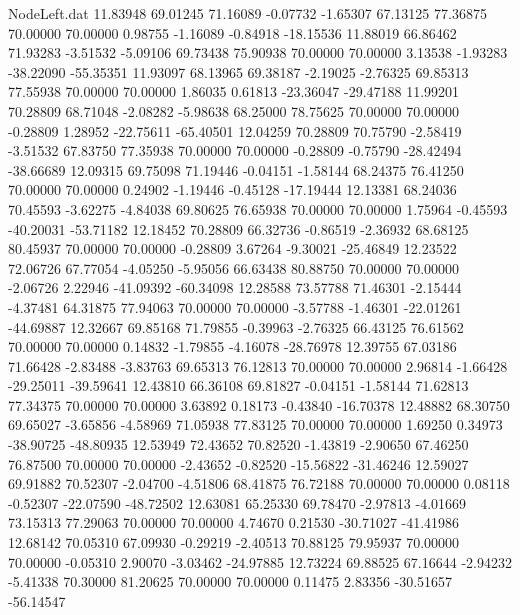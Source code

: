 \begin{filecontents}{NodeLeft.dat}
  11.83948   69.01245   71.16089    -0.07732   -1.65307   67.13125   77.36875   70.00000   70.00000    0.98755   -1.16089   -0.84918  -18.15536
  11.88019   66.86462   71.93283    -3.51532   -5.09106   69.73438   75.90938   70.00000   70.00000    3.13538   -1.93283  -38.22090  -55.35351
  11.93097   68.13965   69.38187    -2.19025   -2.76325   69.85313   77.55938   70.00000   70.00000    1.86035    0.61813  -23.36047  -29.47188
  11.99201   70.28809   68.71048    -2.08282   -5.98638   68.25000   78.75625   70.00000   70.00000   -0.28809    1.28952  -22.75611  -65.40501
  12.04259   70.28809   70.75790    -2.58419   -3.51532   67.83750   77.35938   70.00000   70.00000   -0.28809   -0.75790  -28.42494  -38.66689
  12.09315   69.75098   71.19446    -0.04151   -1.58144   68.24375   76.41250   70.00000   70.00000    0.24902   -1.19446   -0.45128  -17.19444
  12.13381   68.24036   70.45593    -3.62275   -4.84038   69.80625   76.65938   70.00000   70.00000    1.75964   -0.45593  -40.20031  -53.71182
  12.18452   70.28809   66.32736    -0.86519   -2.36932   68.68125   80.45937   70.00000   70.00000   -0.28809    3.67264   -9.30021  -25.46849
  12.23522   72.06726   67.77054    -4.05250   -5.95056   66.63438   80.88750   70.00000   70.00000   -2.06726    2.22946  -41.09392  -60.34098
  12.28588   73.57788   71.46301    -2.15444   -4.37481   64.31875   77.94063   70.00000   70.00000   -3.57788   -1.46301  -22.01261  -44.69887
  12.32667   69.85168   71.79855    -0.39963   -2.76325   66.43125   76.61562   70.00000   70.00000    0.14832   -1.79855   -4.16078  -28.76978
  12.39755   67.03186   71.66428    -2.83488   -3.83763   69.65313   76.12813   70.00000   70.00000    2.96814   -1.66428  -29.25011  -39.59641
  12.43810   66.36108   69.81827    -0.04151   -1.58144   71.62813   77.34375   70.00000   70.00000    3.63892    0.18173   -0.43840  -16.70378
  12.48882   68.30750   69.65027    -3.65856   -4.58969   71.05938   77.83125   70.00000   70.00000    1.69250    0.34973  -38.90725  -48.80935
  12.53949   72.43652   70.82520    -1.43819   -2.90650   67.46250   76.87500   70.00000   70.00000   -2.43652   -0.82520  -15.56822  -31.46246
  12.59027   69.91882   70.52307    -2.04700   -4.51806   68.41875   76.72188   70.00000   70.00000    0.08118   -0.52307  -22.07590  -48.72502
  12.63081   65.25330   69.78470    -2.97813   -4.01669   73.15313   77.29063   70.00000   70.00000    4.74670    0.21530  -30.71027  -41.41986
  12.68142   70.05310   67.09930    -0.29219   -2.40513   70.88125   79.95937   70.00000   70.00000   -0.05310    2.90070   -3.03462  -24.97885
  12.73224   69.88525   67.16644    -2.94232   -5.41338   70.30000   81.20625   70.00000   70.00000    0.11475    2.83356  -30.51657  -56.14547

\end{filecontents}
